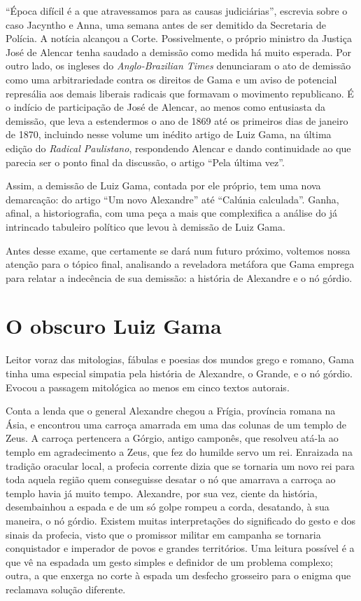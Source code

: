 ``Época difícil é a que atravessamos para as causas judiciárias'',
escrevia sobre o caso Jacyntho e Anna, uma semana antes de ser demitido
da Secretaria de Polícia. A notícia alcançou a Corte. Possivelmente, o
próprio ministro da Justiça José de Alencar tenha saudado a demissão
como medida há muito esperada. Por outro lado, os ingleses do
\emph{Anglo-Brazilian Times} denunciaram o ato de demissão como uma
arbitrariedade contra os direitos de Gama e um aviso de potencial
represália aos demais liberais radicais que formavam o movimento
republicano. É o indício de participação de José de Alencar, ao menos
como entusiasta da demissão, que leva a estendermos o ano de 1869 até os
primeiros dias de janeiro de 1870, incluindo nesse volume um inédito
artigo de Luiz Gama, na última edição do \emph{Radical Paulistano},
respondendo Alencar e dando continuidade ao que parecia ser o ponto
final da discussão, o artigo ``Pela última vez''.

Assim, a demissão de Luiz Gama, contada por ele próprio, tem uma nova
demarcação: do artigo ``Um novo Alexandre'' até ``Calúnia
calculada''. Ganha, afinal, a historiografia, com uma peça a mais que
complexifica a análise do já intrincado tabuleiro político que levou à
demissão de Luiz Gama.

Antes desse exame, que certamente se dará num futuro próximo, voltemos
nossa atenção para o tópico final, analisando a reveladora metáfora que
Gama emprega para relatar a indecência de sua demissão: a história de
Alexandre e o nó górdio.

\section{O obscuro Luiz Gama}

Leitor voraz das mitologias, fábulas e poesias dos mundos grego e
romano, Gama tinha uma especial simpatia pela história de Alexandre, o
Grande, e o nó górdio. Evocou a passagem mitológica ao menos em cinco
textos autorais.

Conta a lenda que o general Alexandre chegou a Frígia, província romana
na Ásia, e encontrou uma carroça amarrada em uma das colunas de um
templo de Zeus. A carroça pertencera a Górgio, antigo camponês, que
resolveu atá-la ao templo em agradecimento a Zeus, que fez do humilde
servo um rei. Enraizada na tradição oracular local, a profecia corrente
dizia que se tornaria um novo rei para toda aquela região quem
conseguisse desatar o nó que amarrava a carroça ao templo havia já muito
tempo. Alexandre, por sua vez, ciente da história, desembainhou a espada
e de um só golpe rompeu a corda, desatando, à sua maneira, o nó górdio.
Existem muitas interpretações do significado do gesto e dos sinais da
profecia, visto que o promissor militar em campanha se tornaria
conquistador e imperador de povos e grandes territórios. Uma leitura
possível é a que vê na espadada um gesto simples e definidor de um
problema complexo; outra, a que enxerga no corte à espada um desfecho
grosseiro para o enigma que reclamava solução diferente.

